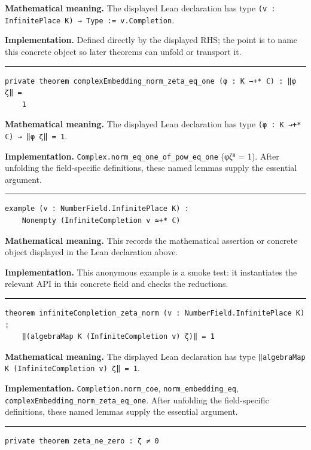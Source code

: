 \documentclass[UTF8,a4paper,11pt,fontset=fandol]{ctexart}
\theoremstyle{definition}
\newcommand{\statementsep}{\par\medskip\hrule\medskip}
\begin{document}
\noindent\textbf{Mathematical meaning.} The displayed Lean declaration has type \texttt{(v : InfinitePlace K) → Type := v.\allowbreak{}Completion}.\par
\noindent\textbf{Implementation.} Defined directly by the displayed RHS; the point is to name this concrete object so later theorems can unfold or transport it.\par
\statementsep
\begin{verbatim}
private theorem complexEmbedding_norm_zeta_eq_one (φ : K →+* ℂ) : ‖φ ζ‖ =
    1
\end{verbatim}
\noindent\textbf{Mathematical meaning.} The displayed Lean declaration has type \texttt{(φ : K →+* ℂ) → ‖φ ζ‖ = 1}.\par
\noindent\textbf{Implementation.} \texttt{Complex.\allowbreak{}norm\_\allowbreak{}eq\_\allowbreak{}one\_\allowbreak{}of\_\allowbreak{}pow\_\allowbreak{}eq\_\allowbreak{}one} (φζ⁸ = 1). After unfolding the field-specific definitions, these named lemmas supply the essential argument.\par
\statementsep
\begin{verbatim}
example (v : NumberField.InfinitePlace K) :
    Nonempty (InfiniteCompletion v ≃+* ℂ)
\end{verbatim}
\noindent\textbf{Mathematical meaning.} This records the mathematical assertion or concrete object displayed in the Lean declaration above.\par
\noindent\textbf{Implementation.} This anonymous example is a smoke test: it instantiates the relevant API in this concrete field and checks the reductions.\par
\statementsep
\begin{verbatim}
theorem infiniteCompletion_zeta_norm (v : NumberField.InfinitePlace K) :
    ‖(algebraMap K (InfiniteCompletion v) ζ)‖ = 1
\end{verbatim}
\noindent\textbf{Mathematical meaning.} The displayed Lean declaration has type \texttt{‖algebraMap K (InfiniteCompletion v) ζ‖ = 1}.\par
\noindent\textbf{Implementation.} \texttt{Completion.\allowbreak{}norm\_\allowbreak{}coe}, \texttt{norm\_\allowbreak{}embedding\_\allowbreak{}eq}, \texttt{complexEmbedding\_\allowbreak{}norm\_\allowbreak{}zeta\_\allowbreak{}eq\_\allowbreak{}one}. After unfolding the field-specific definitions, these named lemmas supply the essential argument.\par
\statementsep
\begin{verbatim}
private theorem zeta_ne_zero : ζ ≠ 0
\end{verbatim}
\end{document}
